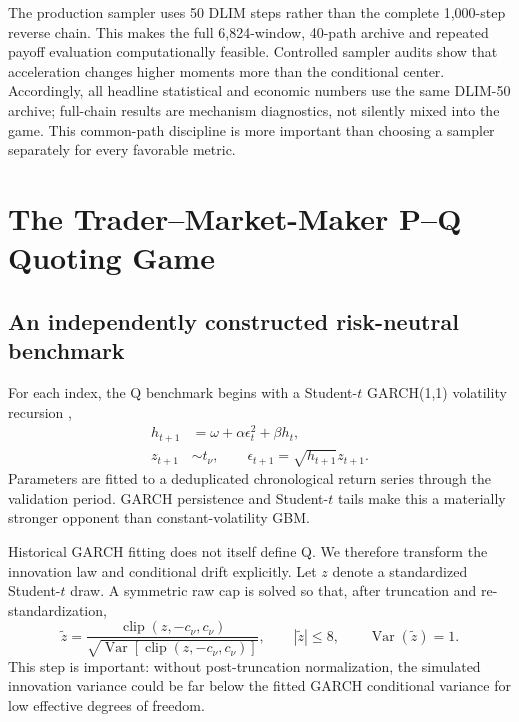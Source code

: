 ﻿\documentclass[12pt,letterpaper]{article}
\begin{document}
The production sampler uses 50 DLIM steps rather than the complete 1{,}000-step
reverse chain. This makes the full 6{,}824-window, 40-path archive and repeated
payoff evaluation computationally feasible. Controlled sampler audits show
that acceleration changes higher moments more than the conditional center.
Accordingly, all headline statistical and economic numbers use the same
DLIM-50 archive; full-chain results are mechanism diagnostics, not silently
mixed into the game. This common-path discipline is more important than
choosing a sampler separately for every favorable metric.

\section{The Trader--Market-Maker P--Q Quoting Game}\label{sec:game}
\subsection{An independently constructed risk-neutral benchmark}

For each index, the Q benchmark begins with a Student-$t$ GARCH(1,1) volatility
recursion \citep{bollerslev1986garch},
\begin{align}
h_{t+1} &= \omega+\alpha \epsilon_t^2+\beta h_t,\\
z_{t+1} &\sim t_\nu,\qquad \epsilon_{t+1}=\sqrt{h_{t+1}}z_{t+1}.
\end{align}
Parameters are fitted to a deduplicated chronological return series through
the validation period. GARCH persistence and Student-$t$ tails make this a
materially stronger opponent than constant-volatility GBM.

Historical GARCH fitting does not itself define Q. We therefore transform the
innovation law and conditional drift explicitly. Let $z$ denote a standardized
Student-$t$ draw. A symmetric raw cap is solved so that, after truncation and
re-standardization,
\begin{equation}
\widetilde z
=\frac{\operatorname{clip}(z,-c_\nu,c_\nu)}
{\sqrt{\operatorname{Var}[\operatorname{clip}(z,-c_\nu,c_\nu)]}},
\qquad |\widetilde z|\leq 8,\qquad
\operatorname{Var}(\widetilde z)=1.
\end{equation}
This step is important: without post-truncation normalization, the simulated
innovation variance could be far below the fitted GARCH conditional variance
for low effective degrees of freedom.
\end{document}
